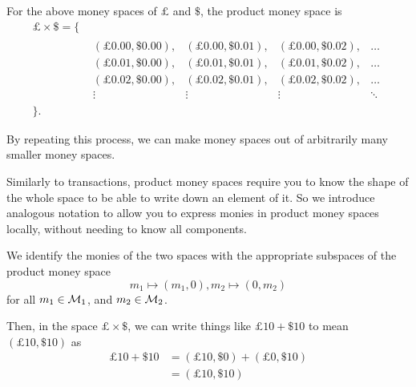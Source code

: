 \begin{example}
    For the above money spaces of $\pounds$ and $\$$, the product money space is
    \begin{equation*}
        \begin{array}{ll}
            \pounds \times \$ = \{ \\
            & \begin{matrix}
                  (\pounds 0.00, \$ 0.00), & (\pounds 0.00, \$ 0.01), & (\pounds 0.00, \$ 0.02), & \dots \\
                  (\pounds 0.01, \$ 0.00), & (\pounds 0.01, \$ 0.01), & (\pounds 0.01, \$ 0.02), & \dots \\
                  (\pounds 0.02, \$ 0.00), & (\pounds 0.02, \$ 0.01), & (\pounds 0.02, \$ 0.02), & \dots \\
                  \vdots & \vdots & \vdots & \ddots
            \end{matrix} \\
            \}.
        \end{array}
    \end{equation*}
\end{example}

By repeating this process, we can make money spaces out of arbitrarily many smaller money spaces.

Similarly to transactions, product money spaces require you to know the shape of the whole space to be able to write down an element of it.
So we introduce analogous notation to allow you to express monies in product money spaces locally, without needing to know all components.

\begin{notation}
    We identify the monies of the two spaces with the appropriate subspaces of the product money space
    \begin{equation*}
        m_1 \mapsto (m_1, 0),
        m_2 \mapsto (0, m_2)
    \end{equation*}
    for all $m_1 \in \mathcal{M}_1$, and $m_2 \in \mathcal{M}_2$.
\end{notation}

\begin{example}
    Then, in the space $\pounds \times \$$, we can write things like $\pounds 10 + \$ 10$ to mean $(\pounds 10, \$ 10)$ as
    \begin{align*}
        \pounds 10 + \$ 10 &= (\pounds 10, \$ 0) + (\pounds 0, \$ 10) \\
        &= (\pounds 10, \$ 10)
    \end{align*}
\end{example}

